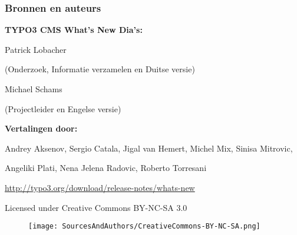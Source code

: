 \begin{frame}[fragile]
	\frametitle{Bronnen en auteurs}

	\vspace{-0.6cm}

	\centerline{\textbf{TYPO3 CMS What's New Dia's:}}

	\begin{center}
		\smaller
			\centerline{Patrick Lobacher}
			\centerline{(Onderzoek, Informatie verzamelen en Duitse versie)}
			\vspace{0.1cm}
			\centerline{Michael Schams}
			\centerline{(Projectleider en Engelse versie)}
		\normalsize
	\end{center}
	\vspace{-0.6cm}
	\begin{center}
		\smaller
			\centerline{\textbf{Vertalingen door:}}
			\centerline{Andrey Aksenov, Sergio Catala, Jigal van Hemert, Michel Mix, Sinisa Mitrovic,}
			\centerline{Angeliki Plati, Nena Jelena Radovic, Roberto Torresani}
		\normalsize
	\end{center}
	\vspace{-0.6cm}
	\smaller\begin{center}\url{http://typo3.org/download/release-notes/whats-new}\end{center}\normalsize

	\smaller\begin{center}Licensed under Creative Commons BY-NC-SA 3.0\end{center}\normalsize
	\begin{figure}\vspace*{-0.3cm}
		\texttt{[image: SourcesAndAuthors/CreativeCommons-BY-NC-SA.png]}
	\end{figure}

\end{frame}

